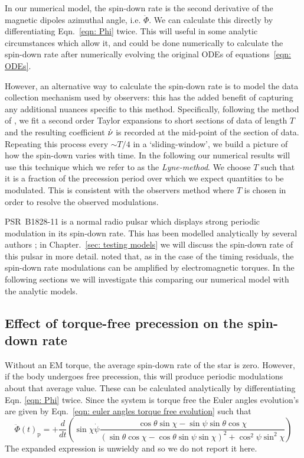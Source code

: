 \documentclass[../full_thesis/full_thesis.tex]{subfiles}
\begin{document}
In our numerical model, the spin-down rate is the second derivative of the
magnetic dipoles azimuthal angle, i.e.  $\ddot{\Phi}$. We can calculate this
directly by differentiating Eqn.~\eqref{eqn: Phi} twice. This will useful in
some analytic circumstances which allow it, and could be done numerically to
calculate the spin-down rate after numerically evolving the original ODEs
of equations~\eqref{eqn: ODEs}.

However, an alternative way to calculate the spin-down rate is to model the
data collection mechanism used by observers: this has the added benefit of
capturing any additional nuances specific to this method. Specifically,
following the method of \citet{Lyne2010}, we fit a second order Taylor
expansions to short sections of data of length $T$ and the resulting
coefficient $\dot{\nu}$ is recorded at the mid-point of the section of data.
Repeating this process every $\sim T/4$ in a `sliding-window', we build a
picture of how the spin-down varies with time.  In the following our numerical
results will use this technique which we refer to as the \emph{Lyne-method}.
We choose $T$ such that it is a fraction of the precession period over which we
expect quantities to be modulated. This is consistent with the observers method
where $T$ is chosen in order to resolve the observed modulations.

PSR~B1828-11 is a normal radio pulsar which displays strong periodic modulation
in its spin-down rate. This has been modelled analytically by several authors
\citep{Stairs2000, Jones2001, Link2001, Akgun2006}; in Chapter.~\ref{sec: testing models}
we will discuss the spin-down rate of this pulsar in more detail. \citet{Jones2001}
noted that, as in the case of the timing residuals, the spin-down rate modulations
can be amplified by electromagnetic torques. In the following sections we will
investigate this comparing our numerical model with the analytic models.

\subsection{Effect of torque-free precession on the spin-down rate}
\label{sec: spin-down free precession}

Without an EM torque, the average spin-down rate of the star is zero. However, if
the body undergoes free precession, this will produce periodic modulations about
that average value.
These can be calculated analytically by differentiating Eqn. \eqref{eqn: Phi}
twice. Since the system is torque free the Euler angles evolution's are given
by Eqn.~\eqref{eqn: euler angles torque free evolution} such that
\begin{equation}
    \ddot{\Phi}(t)_{\mathrm{p}} =
+ \frac{d}{dt}\left(
        \sin\chi\dot{\psi} \frac{\cos\theta\sin\chi - \sin \psi \sin \theta \cos\chi
}{(\sin\theta \cos \chi - \cos \theta \sin \psi \sin \chi)^{2} + \cos^{2}\psi \sin^{2} \chi}
\right)
\label{eqn: Phi_ddot FP}
\end{equation}
The expanded expression is unwieldy and so we do not report it here.
\end{document}
